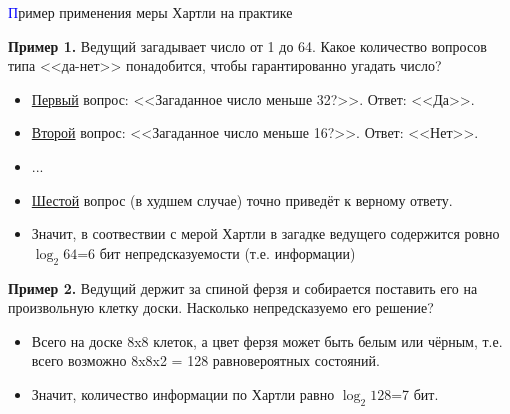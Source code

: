 \begin{frame}[t]{\large \textcolor{blue}{П}ример применения меры Хартли на практике}
	\begin{spacing}{0.5}
		\small
		\noindent \textbf{Пример 1.} Ведущий загадывает число от 1 до 64. Какое количество вопросов типа <<да-нет>> понадобится, чтобы гарантированно угадать число?
		\begin{itemize}
			\item \underline{Первый} вопрос: <<Загаданное число меньше 32?>>. Ответ: <<Да>>.
			\item \underline{Второй} вопрос: <<Загаданное число меньше 16?>>. Ответ: <<Нет>>.
			\item \hspace{0.5cm} ...
			\item \underline{Шестой} вопрос (в худшем случае) точно приведёт к верному ответу.
			\item Значит, в соотвествии с мерой Хартли в загадке ведущего содержится ровно $\log_2{64}$=6 бит непредсказуемости (т.е. информации)
		\end{itemize}
		
		\noindent \textbf{Пример 2.} Ведущий держит за спиной ферзя и собирается поставить его на произвольную клетку доски. Насколько непредсказуемо его решение?
		
		\begin{itemize}
			\item Всего на доске 8x8 клеток, а цвет ферзя может быть белым или чёрным, т.е. всего возможно 8x8x2 = 128 равновероятных состояний.
			\item Значит, количество информации по Хартли равно $\log_2{128}$=7 бит.
		\end{itemize}
	\end{spacing}
\end{frame}